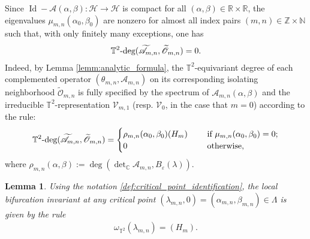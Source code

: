 \documentclass[11pt]{amsart}
\def\bc{{\mathbb{C}}}
\def\bn{{\mathbb{N}}}
\def\br{{\mathbb{R}}}
\def\bz{{\mathbb{Z}}}
\def\bt{{\mathbb{T}}}
\def\br{\mathbb R}
\def\wt{\widetilde}
\def\wt{\widetilde}
\def\t2deg{\mathbb T^2\text{\rm -deg}}
\DeclareMathOperator{\id}{Id}
\newtheorem{lemma}{Lemma}[section]
\begin{document}
Since $\id - \mathscr A(\alpha,\beta): \mathscr H \rightarrow \mathscr H$ is compact for all $(\alpha,\beta) \in \br \times \br$, the eigenvalues $\mu_{m,n}(\alpha_0,\beta_0)$ are nonzero for almost all index pairs $(m,n) \in \bz \times \bn$ such that, with only finitely many exceptions, one has
\begin{align*}
 \t2deg( \wt{\mathscr A}_{m,n}, \wt{\mathscr O}_{m,n}) = 0.
\end{align*}
Indeed, by Lemma \ref{lemm:analytic_formula}, the $\bt^2$-equivariant degree of each complemented operator $(\theta_{m,n}, \mathscr A_{m,n})$ on its corresponding isolating neighborhood 
$\wt{\mathscr O}_{m,n}$ is fully specified by the spectrum of $\mathscr A_{m,n}(\alpha,\beta)$ and the irreducible $\bt^2$-representation $\mathcal V_{m,1}$ (resp. $\mathcal V_0$, in the case that $m=0$) according to the rule:
\begin{align*}
        \t2deg( \wt{\mathscr A}_{m,n}, \wt{\mathscr O}_{m,n}) = 
\begin{cases}
    \rho_{m,n}(\alpha_0,\beta_0) (H_{m}) \quad & \text{ if } \mu_{m,n}(\alpha_0,\beta_0) = 0; \\
        0 & \text{ otherwise,}
    \end{cases}
\end{align*}   
where $\rho_{m,n}(\alpha,\beta) := \deg( \det\nolimits_\bc \mathscr A_{m,n}, B_\varepsilon(\lambda))$. 
\begin{lemma} \label{lemm:local_bif_inv_comp_formula} \rm
Using the notation \eqref{def:critical_point_identification}, the local bifurcation invariant at any critical point $(\lambda_{m,n},0) = (\alpha_{m,n},\beta_{m,n}) \in \Lambda$ is given by the rule
\begin{align}
    \omega_{\bt^2}(\lambda_{m,n}) = (H_m).
\end{align}
\end{lemma}
\end{document}
